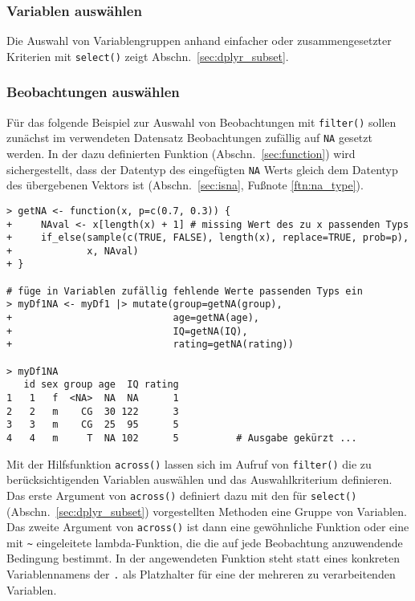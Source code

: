 \subsubsection{Variablen auswählen}

Die Auswahl von Variablengruppen anhand einfacher oder zusammengesetzter Kriterien mit \lstinline!select()! zeigt Abschn.\ \ref{sec:dplyr_subset}.

\subsubsection{Beobachtungen auswählen}

Für das folgende Beispiel zur Auswahl von Beobachtungen mit \lstinline!filter()! sollen zunächst im verwendeten Datensatz Beobachtungen zufällig auf \lstinline!NA! gesetzt werden. In der dazu definierten Funktion (Abschn.\ \ref{sec:function}) wird sichergestellt, dass der Datentyp des eingefügten \lstinline!NA! Werts gleich dem Datentyp des übergebenen Vektors ist (Abschn.\ \ref{sec:isna}, Fußnote \ref{ftn:na_type}).
\begin{lstlisting}
> getNA <- function(x, p=c(0.7, 0.3)) {
+     NAval <- x[length(x) + 1] # missing Wert des zu x passenden Typs
+     if_else(sample(c(TRUE, FALSE), length(x), replace=TRUE, prob=p),
+             x, NAval)
+ }

# füge in Variablen zufällig fehlende Werte passenden Typs ein
> myDf1NA <- myDf1 |> mutate(group=getNA(group),
+                            age=getNA(age),
+                            IQ=getNA(IQ),
+                            rating=getNA(rating))

> myDf1NA
   id sex group age  IQ rating
1   1   f  <NA>  NA  NA      1
2   2   m    CG  30 122      3
3   3   m    CG  25  95      5
4   4   m     T  NA 102      5          # Ausgabe gekürzt ...
\end{lstlisting}

Mit der Hilfsfunktion \lstinline!across()! lassen sich im Aufruf von \lstinline!filter()! die zu berücksichtigenden Variablen auswählen und das Auswahlkriterium definieren. Das erste Argument von \lstinline!across()! definiert dazu mit den für \lstinline!select()! (Abschn.\ \ref{sec:dplyr_subset}) vorgestellten Methoden eine Gruppe von Variablen. Das zweite Argument von \lstinline!across()! ist dann eine gewöhnliche Funktion oder eine mit \lstinline!~! eingeleitete lambda-Funktion, die die auf jede Beobachtung anzuwendende Bedingung bestimmt. In der angewendeten Funktion steht statt eines konkreten Variablennamens der \lstinline!.! als Platzhalter für eine der mehreren zu verarbeitenden Variablen.

